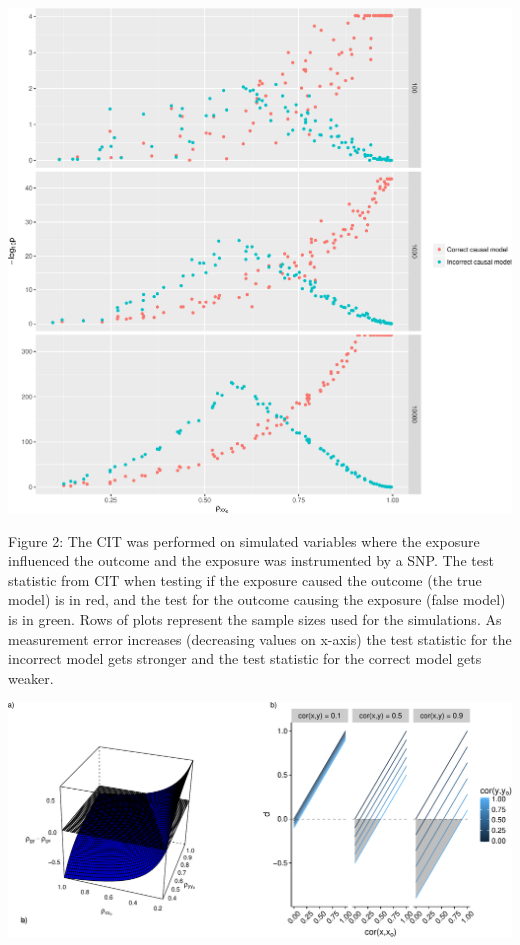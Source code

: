 \documentclass[]{article}
\begin{document}
\includegraphics{manuscript_files/figure-latex/cit_measurement_error_figure-1.pdf}

Figure 2: The CIT was performed on simulated variables where the
exposure influenced the outcome and the exposure was instrumented by a
SNP. The test statistic from CIT when testing if the exposure caused the
outcome (the true model) is in red, and the test for the outcome causing
the exposure (false model) is in green. Rows of plots represent the
sample sizes used for the simulations. As measurement error increases
(decreasing values on x-axis) the test statistic for the incorrect model
gets stronger and the test statistic for the correct model gets weaker.

\newpage

\includegraphics{manuscript_files/figure-latex/steiger_sensitivity_plot-1.pdf}
\end{document}
